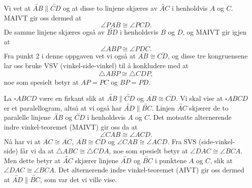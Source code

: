\begin{oppgave}[5.1.2]
\begin{enumerate}
        Vi vet at $\overleftrightarrow{AB}\parallel\overleftrightarrow{CD}$ og at disse to linjene skjæres av $\overleftrightarrow{AC}$ i henholdvis $A$ og $C$. 
        MAIVT gir oss dermed at 
        $$\angle PAB\cong \angle PCD.$$
        De samme linjene skjæres også av $\overleftrightarrow{BD}$ i henholdsvis $B$ og $D$, og MAIVT gir igjen at 
        $$\angle ABP\cong \angle PDC.$$
        Fra punkt 2 i denne oppgaven vet vi også at $\overline{AB}\cong \overline{CD}$, 
        og disse tre kongruensene lar oss bruke VSV (vinkel-side-vinkel) til å konkludere med at 
        $$\triangle ABP\cong \triangle CDP,$$
        noe som spesielt betyr at $AP=PC$ og $BP=PD$.  

        \begin{figure}[H]
            \centering
             
        \end{figure}
    \end{enumerate}
\end{oppgave}

\begin{oppgave}[5.1.3]
    La $\square ABCD$ være en firkant slik at $\overleftrightarrow{AB}\parallel\overleftrightarrow{CD}$ og $\overline{AB}\cong \overline{CD}$. 
    Vi skal vise at $\square ABCD$ er et paralellogram, altså at vi også har $\overleftrightarrow{AD}\parallel\overleftrightarrow{BC}$. 
    Linjen $\overleftrightarrow{AC}$ skjærer de to paralelle linjene $\overleftrightarrow{AB}$ og $\overleftrightarrow{CD}$ i henholdsvis $A$ og $C$. 
    Det motsatte alternerende indre vinkel-teoremet (MAIVT) gir oss da at 
    $$\angle CAB\cong \angle ACD.$$
    Nå har vi at $\overline{AC}\cong \overline{AC}$, $\overline{AB}\cong \overline{CD}$ og $\angle CAB\cong \angle ACD$. 
    Fra SVS (side-vinkel-side) får vi da at $\triangle ABC\cong\triangle CDA$, noe som spesielt betyr at $\angle DAC\cong \angle BCA$. 
    Men dette betyr at $\overleftrightarrow{AC}$ skjærer linjene $\overleftrightarrow{AD}$ og $\overleftrightarrow{BC}$ i punktene $A$ og $C$, slik at $\angle DAC\cong \angle BCA$. 
    Det alternerende indre vinkel-teoremet (AIVT) gir oss dermed at $\overleftrightarrow{AD}\parallel\overleftrightarrow{BC}$, som var det vi ville vise. 

    \begin{figure}[H]
        \centering
         
    \end{figure}
\end{oppgave}